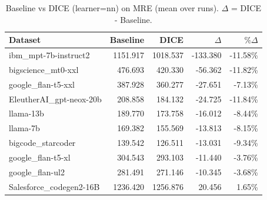 \begin{table}[t]
\centering
\small
\caption{Baseline vs DICE (learner=nn) on MRE (mean over runs). $\Delta$ = DICE - Baseline.}
\label{tab:baseline-vs-dice-nn-MRE}
\begin{tabular}{lrrrr}
\toprule
Dataset & Baseline & DICE & $\Delta$ & $\%\Delta$ \\
\midrule
ibm\_mpt-7b-instruct2 & 1151.917 & 1018.537 & -133.380 & -11.58\% \\
bigscience\_mt0-xxl & 476.693 & 420.330 & -56.362 & -11.82\% \\
google\_flan-t5-xxl & 387.928 & 360.277 & -27.651 & -7.13\% \\
EleutherAI\_gpt-neox-20b & 208.858 & 184.132 & -24.725 & -11.84\% \\
llama-13b & 189.770 & 173.758 & -16.012 & -8.44\% \\
llama-7b & 169.382 & 155.569 & -13.813 & -8.15\% \\
bigcode\_starcoder & 139.542 & 126.511 & -13.031 & -9.34\% \\
google\_flan-t5-xl & 304.543 & 293.103 & -11.440 & -3.76\% \\
google\_flan-ul2 & 281.491 & 271.146 & -10.345 & -3.68\% \\
Salesforce\_codegen2-16B & 1236.420 & 1256.876 & 20.456 & 1.65\% \\
\bottomrule
\end{tabular}
\end{table}